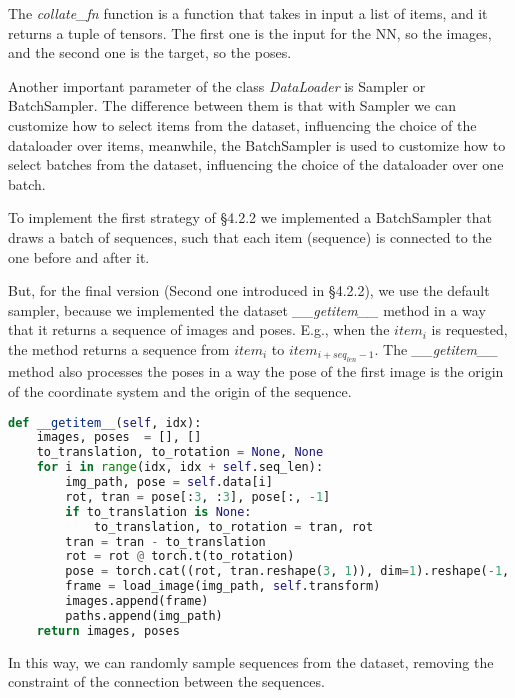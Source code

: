 The \textit{collate\_fn} function is a function that takes in input a list of items, and it returns a tuple of tensors.
The first one is the input for the NN, so the images, and the second one is the target, so the poses.

Another important parameter of the class \textit{DataLoader} is Sampler or BatchSampler.
The difference between them is that with Sampler we can customize how to select items from the dataset, influencing the choice of the dataloader over items, meanwhile, the BatchSampler is used to customize how to select batches from the dataset, influencing the choice of the dataloader over one batch.

To implement the first strategy of \S4.2.2 we implemented a BatchSampler that draws a batch of sequences, such that each item (sequence) is connected to the one before and after it.

But, for the final version (Second one introduced in \S4.2.2), we use the default sampler, because we implemented the dataset \textit{\_\_getitem\_\_} method in a way that it returns a sequence of images and poses.
E.g., when the $item_i$ is requested, the method returns a sequence from $item_i$ to $item_{i + seq_{len}-1}$.
The \textit{\_\_getitem\_\_} method also processes the poses in a way the pose of the first image is the origin of the coordinate system and the origin of the sequence.
\begin{lstlisting}[language=python,label={lst:dataset-get-item}, caption ={The \textit{\_\_getitem\_\_} method of the \textit{KittiDataset} class.}]
def __getitem__(self, idx):
    images, poses  = [], []
    to_translation, to_rotation = None, None
    for i in range(idx, idx + self.seq_len):
        img_path, pose = self.data[i]
        rot, tran = pose[:3, :3], pose[:, -1]
        if to_translation is None:
            to_translation, to_rotation = tran, rot
        tran = tran - to_translation
        rot = rot @ torch.t(to_rotation)
        pose = torch.cat((rot, tran.reshape(3, 1)), dim=1).reshape(-1, )
        frame = load_image(img_path, self.transform)
        images.append(frame)
        paths.append(img_path)
    return images, poses
\end{lstlisting}
In this way, we can randomly sample sequences from the dataset, removing the constraint of the connection between the sequences.

